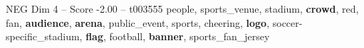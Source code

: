 \begin{textsample}{NEG Dim 4 – Score -2.00 – t003555}  \label{ex:f4_neg_025}
people, sports\_venue, stadium, \textbf{crowd}, red, fan, \textbf{audience}, \textbf{arena}, public\_event, sports, cheering, \textbf{logo}, soccer-specific\_stadium, \textbf{flag}, football, \textbf{banner}, sports\_fan\_jersey

\end{textsample}
